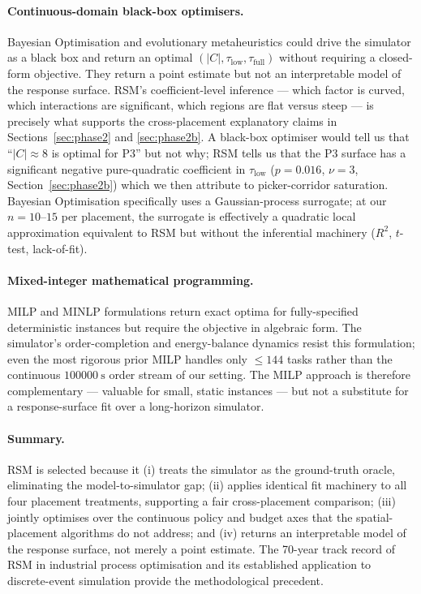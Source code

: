 \documentclass[conference]{IEEEtran}
\begin{document}
\paragraph{Continuous-domain black-box optimisers.}
Bayesian Optimisation \cite{shahriari2016} and evolutionary metaheuristics could drive the simulator as a black box and return an optimal $(|C|, \tau_\text{low}, \tau_\text{full})$ without requiring a closed-form objective. They return a point estimate but not an interpretable model of the response surface. RSM's coefficient-level inference --- which factor is curved, which interactions are significant, which regions are flat versus steep --- is precisely what supports the cross-placement explanatory claims in Sections~\ref{sec:phase2} and \ref{sec:phase2b}. A black-box optimiser would tell us that ``$|C| \approx 8$ is optimal for P3'' but not why; RSM tells us that the P3 surface has a significant negative pure-quadratic coefficient in $\tau_\text{low}$ ($p = 0.016$, $\nu = 3$, Section~\ref{sec:phase2b}) which we then attribute to picker-corridor saturation. Bayesian Optimisation specifically uses a Gaussian-process surrogate; at our $n = 10$--$15$ per placement, the surrogate is effectively a quadratic local approximation equivalent to RSM but without the inferential machinery ($R^2$, $t$-test, lack-of-fit).

\paragraph{Mixed-integer mathematical programming.}
MILP and MINLP formulations \cite{meyer2024,singh2022} return exact optima for fully-specified deterministic instances but require the objective in algebraic form. The simulator's order-completion and energy-balance dynamics resist this formulation; even the most rigorous prior MILP \cite{meyer2024} handles only $\le 144$ tasks rather than the continuous $\SI{100000}{\second}$ order stream of our setting. The MILP approach is therefore complementary --- valuable for small, static instances --- but not a substitute for a response-surface fit over a long-horizon simulator.

\paragraph{Summary.}
RSM is selected because it (i) treats the simulator as the ground-truth oracle, eliminating the model-to-simulator gap; (ii) applies identical fit machinery to all four placement treatments, supporting a fair cross-placement comparison; (iii) jointly optimises over the continuous policy and budget axes that the spatial-placement algorithms do not address; and (iv) returns an interpretable model of the response surface, not merely a point estimate. The 70-year track record of RSM in industrial process optimisation \cite{box1951,myers2016,khuri1996} and its established application to discrete-event simulation \cite{kleijnen2015,sanchez2015} provide the methodological precedent.
\end{document}
